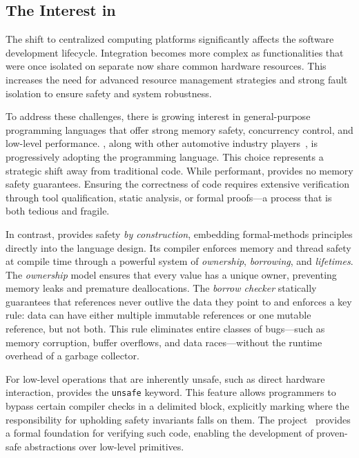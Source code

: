 \subsection{The Interest in \Rust}
\label{sec:intro:gap:rust}

The shift to centralized computing platforms significantly affects the software development
lifecycle. Integration becomes more complex as functionalities that were once isolated on separate
\ecus now share common hardware resources. This increases the need for advanced resource
management strategies and strong fault isolation to ensure safety and system robustness.

To address these challenges, there is growing interest in general-purpose programming languages that
offer strong memory safety, concurrency control, and low-level performance. \ampere, along with
other automotive industry players~\cite{ferrocene,veecle}, is progressively adopting the \Rust
programming language. This choice represents a strategic shift away from traditional \Ci code. While
performant, \Ci provides no memory safety guarantees. Ensuring the correctness of \Ci code requires
extensive verification through tool qualification, static analysis, or formal proofs---a process
that is both tedious and fragile.

In contrast, \Rust provides safety \emph{by construction}, embedding formal-methods principles
directly into the language design. Its compiler enforces memory and thread safety at compile time
through a powerful system of \emph{ownership}, \emph{borrowing}, and \emph{lifetimes}. The
\emph{ownership} model ensures that every value has a unique owner, preventing memory leaks and
premature deallocations. The \emph{borrow checker} statically guarantees that references never
outlive the data they point to and enforces a key rule: data can have either multiple immutable
references or one mutable reference, but not both. This rule eliminates entire classes of
bugs---such as memory corruption, buffer overflows, and data races---without the runtime overhead of
a garbage collector.

For low-level operations that are inherently unsafe, such as direct hardware interaction, \Rust
provides the \texttt{unsafe} keyword. This feature allows programmers to bypass certain compiler
checks in a delimited block, explicitly marking where the responsibility for upholding safety
invariants falls on them. The \RustBelt project~\cite{DBLP:journals/pacmpl/0002JKD18} provides a
formal foundation for verifying such code, enabling the development of proven-safe abstractions over
low-level primitives.

